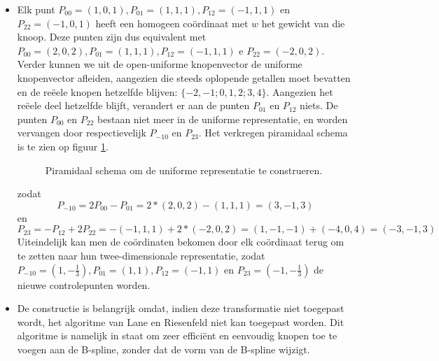 \begin{enumerate}
{\begin{itemize}
		\end{itemize}
	}
		
	{
		\begin{itemize} 	
			\item Elk punt $P_{00} = (1, 0, 1), P_{01} = (1, 1, 1), P_{12} = (-1, 1, 1)$ en $P_{22} = (-1, 0, 1)$ heeft een homogeen coördinaat met $w$ het gewicht van die knoop. Deze punten zijn dus equivalent met $P_{00} = (2, 0, 2), P_{01} = (1, 1, 1), P_{12} = (-1, 1, 1)$ e $P_{22} = (-2, 0 , 2)$. Verder kunnen we uit de open-uniforme knopenvector de uniforme knopenvector afleiden, aangezien die steeds oplopende getallen moet bevatten en de reëele knopen hetzelfde blijven: $\{-2, -1; 0, 1, 2; 3, 4\}$. Aangezien het reëele deel hetzelfde blijft, verandert er aan de punten $P_{01}$ en $P_{12}$ niets. De punten $P_{00}$ en $P_{22}$ bestaan niet meer in de uniforme representatie, en worden vervangen door respectievelijk $P_{-10}$ en $P_{23}$. Het verkregen piramidaal schema is te zien op figuur \ref{fig:open_uniform_naar_uniform}.
			\begin{figure}[ht]
				\centering
				\caption{Piramidaal schema om de uniforme representatie te construeren.}
				\label{fig:open_uniform_naar_uniform}
			\end{figure}

			zodat $$P_{-10} = 2P_{00} - P_{01} = 2 * (2, 0, 2) - (1, 1, 1) = (3, -1, 3)$$ en $$P_{23} = -P_{12} + 2P_{22} = -(-1, 1, 1) + 2 * (-2, 0, 2) = (1, -1, -1) + (-4, 0, 4) = (-3, -1, 3)$$ Uiteindelijk kan men de coördinaten bekomen door elk coördinaat terug om te zetten naar hun twee-dimensionale representatie, zodat $P_{-10} = (1, -\frac{1}{3}), P_{01} = (1, 1), P_{12} = (-1, 1)$ en $P_{23} = (-1, -\frac{1}{3})$ de nieuwe controlepunten worden.

			\item De constructie is belangrijk omdat, indien deze transformatie niet toegepast wordt, het algoritme van Lane en Riesenfeld niet kan toegepast worden. Dit algoritme is namelijk in staat om zeer efficiënt en eenvoudig knopen toe te voegen aan de B-spline, zonder dat de vorm van de B-spline wijzigt.
		\end{itemize}
	}
\end{enumerate}

